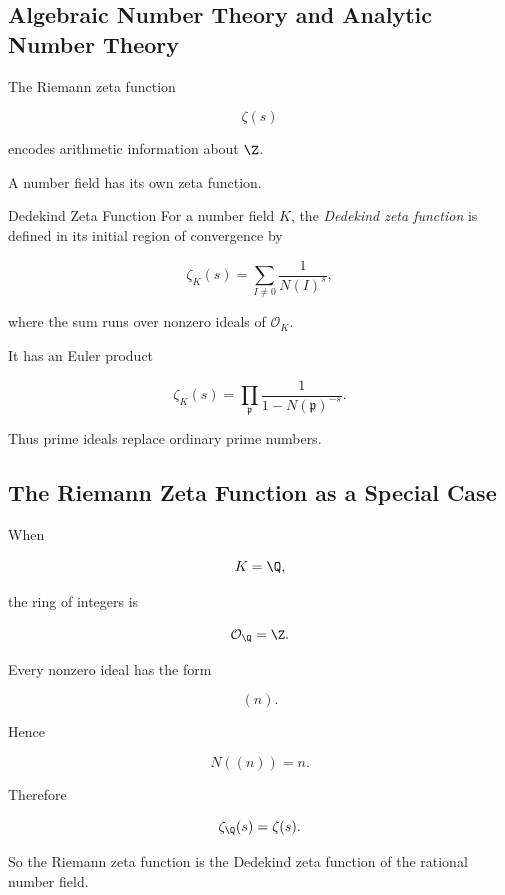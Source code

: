 \subsection{Algebraic Number Theory and Analytic Number Theory}
\label{subsec:algebraic-analytic-number-theory}

The Riemann zeta function

\[ \zeta(s) \]

encodes arithmetic information about \(\Z\).

A number field has its own zeta function.

\begin{definitionbox}{Dedekind Zeta Function}
For a number field \(K\), the \emph{Dedekind zeta function} is defined in its
initial region of convergence by

\[ \boxed{\zeta_K(s)=\sum_{I\neq0}\frac{1}{N(I)^s}}, \]

where the sum runs over nonzero ideals of \(\mathcal O_K\).
\end{definitionbox}

It has an Euler product

\[ \boxed{\zeta_K(s)=\prod_{\mathfrak p}\frac{1}{1-N(\mathfrak p)^{-s}}}. \]

Thus prime ideals replace ordinary prime numbers.

\subsection{The Riemann Zeta Function as a Special Case}
\label{subsec:riemann-zeta-special-case}

When

\[ K=\Q, \]

the ring of integers is

\[ \mathcal O_{\Q}=\Z. \]

Every nonzero ideal has the form

\[ (n). \]

Hence

\[ N((n))=n. \]

Therefore

\[ \zeta_{\Q}(s)=\zeta(s). \]

So the Riemann zeta function is the Dedekind zeta function of the rational
number field.

